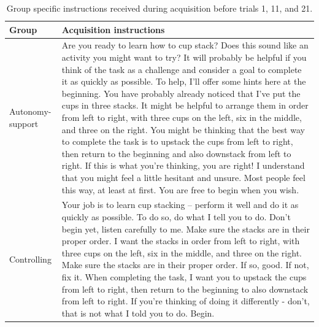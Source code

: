 \documentclass[doc,floatsintext,donotrepeattitle,letterpaper,12pt]{apa7}
\begin{document}
\begin{table}[htb]
    \caption{Group speciﬁc instructions received during acquisition before trials 1, 11, and 21.}
    \label{tab:table2}
    \small
    \begin{tabular}{@{}p{1.3in}p{4.5in}@{}}
    \toprule
    Group            & Acquisition instructions \\
    \midrule
    Autonomy-support & Are you ready to learn how to cup stack? Does this sound like an activity you might want to try? It will probably be helpful if you think of the task as a challenge and consider a goal to complete it as quickly as possible. To help, I'll offer some hints here at the beginning. You have probably already noticed that I've put the cups in three stacks. It might be helpful to arrange them in order from left to right, with three cups on the left, six in the middle, and three on the right. You might be thinking that the best way to complete the task is to upstack the cups from left to right, then return to the beginning and also downstack from left to right. If this is what you're thinking, you are right! I understand that you might feel a little hesitant and unsure. Most people feel this way, at least at first. You are free to begin when you wish. \\
    \addlinespace[0.5em]
    Controlling      & Your job is to learn cup stacking -- perform it well and do it as quickly as possible. To do so, do what I tell you to do. Don't begin yet, listen carefully to me. Make sure the stacks are in their proper order. I want the stacks in order from left to right, with three cups on the left, six in the middle, and three on the right. Make sure the stacks are in their proper order. If so, good. If not, fix it. When completing the task, I want you to upstack the cups from left to right, then return to the beginning to also downstack from left to right. If you're thinking of doing it differently - don't, that is not what I told you to do. Begin. \\
    \bottomrule
    \end{tabular}
\end{table}
\end{document}
